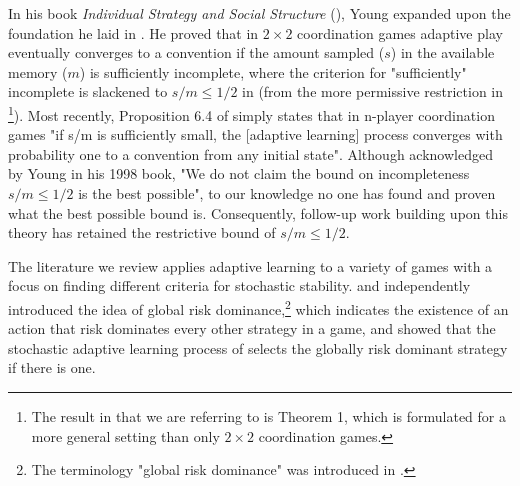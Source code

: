 In his book \emph{Individual Strategy and Social Structure} (\cite{Young1998}),
 Young expanded upon the foundation he laid in \cite{young1993evolution}. He proved that in 
$2\times 2$ coordination games adaptive play eventually converges to a convention if the amount sampled ($s$) in the available memory ($m$) is sufficiently incomplete, where the criterion for "sufficiently" incomplete is slackened to $s/m \leq 1/2$ in \cite{Young1998} (from the more permissive restriction in \cite{young1993evolution}\footnote{The result in \cite{young1993evolution} that we are referring to is Theorem 1, which is formulated for a more general setting than only $2\times 2$ coordination games.}). 
%
Most recently, Proposition 6.4 of \cite{WALLACE2015327} simply states that in n-player coordination games "if s/m is sufficiently small, the [adaptive learning] process converges with probability one to a convention from any initial state". 
Although acknowledged by Young in his 1998 book, "We do not claim the bound on incompleteness $s/m \leq 1/2$ is the best possible", to our knowledge no one has found and proven what the best possible bound is. Consequently, follow-up work building upon this theory has retained the restrictive bound of $s/m \leq 1/2$. 

The literature we review applies adaptive learning to a variety of games with a focus on finding different criteria for stochastic stability. \cite{maruta1997relationship} and \cite{ellison2000basins} independently introduced the idea of global risk dominance,\footnote{The terminology "global risk dominance" was introduced in \cite{maruta1997relationship}.}  which indicates the existence of an action that risk dominates every other strategy in a game, and showed that the stochastic adaptive learning process of \cite{young1993evolution} selects the globally risk dominant strategy if there is one.

